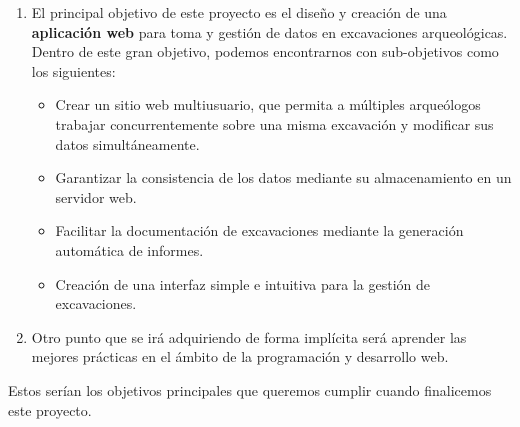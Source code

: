     \begin{enumerate}
        \item El principal objetivo de este proyecto es el diseño y  creación de una
        \textbf{aplicación web} para toma y gestión de datos en excavaciones arqueológicas.
        Dentro de este gran objetivo, podemos encontrarnos con sub-objetivos como los
        siguientes:
            \begin{itemize}
                \item Crear un sitio web multiusuario, que permita a múltiples arqueólogos
                trabajar concurrentemente sobre una misma excavación y modificar sus datos
                simultáneamente.
                \item Garantizar la consistencia de los datos mediante su almacenamiento en
                un servidor web.
                \item Facilitar la documentación de excavaciones mediante la generación
                automática de informes.
                \item Creación de una interfaz simple e intuitiva para la gestión de
                excavaciones.
            \end{itemize}
            \item Otro punto que se irá adquiriendo de forma implícita será aprender las
            mejores prácticas en el ámbito de la programación y desarrollo web.
    \end{enumerate}

Estos serían los objetivos principales que queremos cumplir cuando finalicemos este proyecto. 
